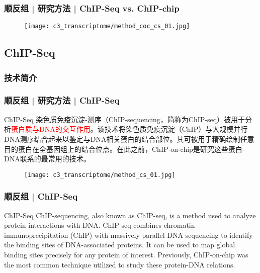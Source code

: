 \begin{frame}
  \frametitle{顺反组 | 研究方法 | ChIP-Seq vs. ChIP-chip}
  \begin{figure}
    \centering
    \texttt{[image: c3\_transcriptome/method\_coc\_cs\_01.jpg]}
  \end{figure}
\end{frame}

\subsection{ChIP-Seq}
\subsubsection{技术简介}

\begin{frame}
  \frametitle{顺反组 | 研究方法 | ChIP-Seq}
  {\footnotesize
  \begin{block}{ChIP-Seq}
    染色质免疫沉淀-测序（ChIP-sequencing，简称为ChIP-seq）被用于分析\textcolor{red}{蛋白质与DNA的交互作用}。该技术将染色质免疫沉淀（ChIP）与大规模并行DNA测序结合起来以鉴定与DNA相关蛋白的结合部位。其可被用于精确绘制任意目的蛋白在全基因组上的结合位点。在此之前，ChIP-on-chip是研究这些蛋白-DNA联系的最常用的技术。
  \end{block}
  }
  \begin{figure}
    \centering
    \texttt{[image: c3\_transcriptome/method\_cs\_01.jpg]}
  \end{figure}
\end{frame}

\begin{frame}
  \frametitle{顺反组 | ChIP-Seq}
  \begin{block}{ChIP-Seq}
    ChIP-sequencing, also known as ChIP-seq, is a method used to analyze protein interactions with DNA. ChIP-seq combines chromatin immunoprecipitation (ChIP) with massively parallel DNA sequencing to identify the binding sites of DNA-associated proteins. It can be used to map global binding sites precisely for any protein of interest. Previously, ChIP-on-chip was the most common technique utilized to study these protein-DNA relations.
  \end{block}
\end{frame}

